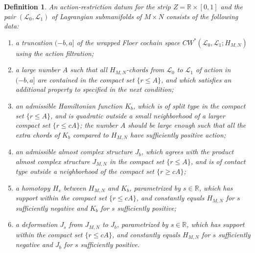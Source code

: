 \documentclass{amsart}
\newtheorem{definition}[theorem]{Definition}
\numberwithin{equation}{section}
\numberwithin{figure}{section}
\begin{document}
\begin{definition} \label{definition of action-restriction datum for strips}
	An action-restriction datum for the strip $Z = \mathbb{R} \times [0, 1]$ and the pair $(\mathcal{L}_{0}, \mathcal{L}_{1})$ of Lagrangian submanifolds of $M \times N$ consists of the following data:
\begin{enumerate}[label=(\roman*)]

\item a truncation $(-b, a]$ of the wrapped Floer cochain space $CW^{*}(\mathcal{L}_{0}, \mathcal{L}_{1}; H_{M, N})$ using the action filtration;

\item a large number $A$ such that all $H_{M, N}$-chords from $\mathcal{L}_{0}$ to $\mathcal{L}_{1}$ of action in $(-b, a]$ are contained in the compact set $\{ r \le A \}$, and which satisfies an additional property to specified in the next condition;

\item an admissible Hamiltonian function $K_{b}$, which is of split type in the compact set $\{ r \le A \}$, and is quadratic outside a small neighborhood of a larger compact set $\{ r \le cA \}$; the number $A$ should be large enough such that all the extra chords of $K_{b}$ compared to $H_{M, N}$ have sufficiently positive action;

\item an admissible almost complex structure $J_{b}$, which agrees with the product almost complex structure $J_{M, N}$ in the compact set $\{ r \le A \}$, and is of contact type outside a neighborhood of the compact set $\{ r \ge cA \}$;

\item a homotopy $H_{s}$ between $H_{M, N}$ and $K_{b}$, parametrized by $s \in \mathbb{R}$, which has support within the compact set $\{r \le cA\}$, and constantly equals $H_{M, N}$ for $s$ sufficiently negative and $K_{b}$ for $s$ sufficiently positive;

\item a deformation $J_{s}$ from $J_{M, N}$ to $J_{b}$, parametrized by $s \in \mathbb{R}$, which has support within the compact set $\{r \le cA\}$, and constantly equals $H_{M, N}$ for $s$ sufficiently negative and $J_{b}$ for $s$ sufficiently positive.

\end{enumerate}
\end{definition}
\end{document}
